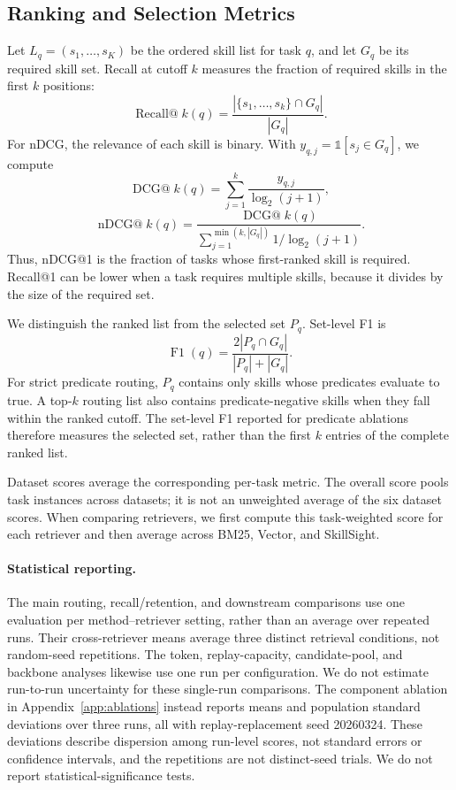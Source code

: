 \subsection{Ranking and Selection Metrics}
\label{app:routing-metrics}
Let $L_q=(s_1,\ldots,s_K)$ be the ordered skill list for task $q$, and let $G_q$ be its required skill set. Recall at cutoff $k$ measures the fraction of required skills in the first $k$ positions:
\[
\operatorname{Recall@}k(q)=\frac{|\{s_1,\ldots,s_k\}\cap G_q|}{|G_q|}.
\]
For nDCG, the relevance of each skill is binary. With $y_{q,j}=\mathds{1}[s_j\in G_q]$, we compute
\[
\operatorname{DCG@}k(q)=\sum_{j=1}^{k}\frac{y_{q,j}}{\log_2(j+1)},
\]
\[
\operatorname{nDCG@}k(q)=\frac{\operatorname{DCG@}k(q)}{\sum_{j=1}^{\min(k,|G_q|)}1/\log_2(j+1)}.
\]
Thus, nDCG@1 is the fraction of tasks whose first-ranked skill is required. Recall@1 can be lower when a task requires multiple skills, because it divides by the size of the required set.

We distinguish the ranked list from the selected set $P_q$. Set-level F1 is
\[
\operatorname{F1}(q)=\frac{2|P_q\cap G_q|}{|P_q|+|G_q|}.
\]
For strict predicate routing, $P_q$ contains only skills whose predicates evaluate to true. A top-$k$ routing list also contains predicate-negative skills when they fall within the ranked cutoff. The set-level F1 reported for predicate ablations therefore measures the selected set, rather than the first $k$ entries of the complete ranked list.

Dataset scores average the corresponding per-task metric. The overall score pools task instances across datasets; it is not an unweighted average of the six dataset scores. When comparing retrievers, we first compute this task-weighted score for each retriever and then average across BM25, Vector, and SkillSight.

\paragraph{Statistical reporting.}
The main routing, recall/retention, and downstream comparisons use one evaluation per method--retriever setting, rather than an average over repeated runs. Their cross-retriever means average three distinct retrieval conditions, not random-seed repetitions. The token, replay-capacity, candidate-pool, and backbone analyses likewise use one run per configuration. We do not estimate run-to-run uncertainty for these single-run comparisons. The component ablation in Appendix~\ref{app:ablations} instead reports means and population standard deviations over three runs, all with replay-replacement seed 20260324. These deviations describe dispersion among run-level scores, not standard errors or confidence intervals, and the repetitions are not distinct-seed trials. We do not report statistical-significance tests.
